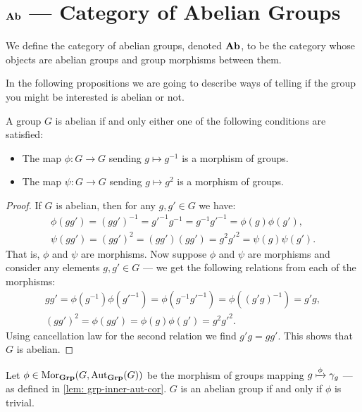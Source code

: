 \section{\texorpdfstring{\({\textbf{Ab}}\)}{Ab} --- Category of Abelian Groups}

\begin{definition}
We define the category of abelian groups, denoted \({\textbf{Ab}}\), to be the category
whose objects are abelian groups and group morphisms between them.
\end{definition}

In the following propositions we are going to describe ways of telling if the
group you might be interested is abelian or not.

\begin{proposition}
A group \(G\) is abelian if and only either one of the following conditions
are satisfied:
\begin{itemize}
  \setlength\itemsep{0em}
  \item The map \(\phi: G \to G\) sending \(g \mapsto g^{-1}\) is a morphism of
    groups.
  \item The map \(\psi: G \to G\) sending \(g \mapsto g^2\) is a morphism of
    groups.
\end{itemize}
\end{proposition}

\begin{proof}
If \(G\) is abelian, then for any \(g, g' \in G\) we have:
\begin{gather*}
  \phi(gg') = (gg')^{-1} = g'^{-1} g^{-1} = g^{-1}g'^{-1} = \phi(g) \phi(g'),
  \\
  \psi(gg') = (gg')^2 = (gg')(gg') = g^2g'^2 = \psi(g)\psi(g').
\end{gather*}
That is, \(\phi\) and \(\psi\) are morphisms. Now suppose \(\phi\) and
\(\psi\) are morphisms and consider any elements \(g, g' \in G\) --- we get
the following relations from each of the morphisms:
\begin{gather*}
  gg' = \phi(g^{-1})\phi(g'^{-1}) = \phi(g^{-1}g'^{-1})
  = \phi((g'g)^{-1}) = g'g,
  \\
  (gg')^2 = \phi(gg') = \phi(g) \phi(g') = g^2 g'^2.
\end{gather*}
Using cancellation law for the second relation we find \(g'g = gg'\). This
shows that \(G\) is abelian.
\end{proof}

\begin{proposition}
Let \(\phi \in \operatorname{Mor}_{\textbf{Grp}}(G, \operatorname{Aut}_{\textbf{Grp}}(G))\) be the morphism of groups mapping
\(g \xmapsto \phi \gamma_g\) --- as defined in \cref{lem: grp-inner-aut-cor}.
\(G\) is an abelian group if and only if \(\phi\) is trivial.
\end{proposition}

